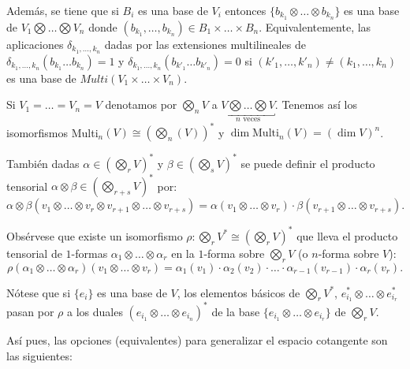 \documentclass[\main/VD_completo.tex]{subfiles}
\begin{document}
\begin{remark}
  Además, se tiene que si \(B_{i}\) es una base de \(V_{i}\) entonces
  \(\{b_{k_{1}}\otimes\dots\otimes b_{k_{n}}\}\) es una base de
  \(V_{1}\bigotimes\dots\bigotimes V_{n}\) donde
  \((b_{k_{1}},\dots,b_{k_{n}})\in B_{1}\times\dots\times B_{n}\).
  Equivalentemente, las aplicaciones \(\delta_{k_{1},\dots,k_{n}}\) dadas por las
  extensiones multilineales de \(\delta_{k_{1},\dots,k_{n}}(b_{k_{1}}\dots
  b_{k_{n}})=1\) y \(\delta_{k_{1},\dots,k_{n}}(b_{k'_{1}}\dots b_{k'_{n}})=0\)
  si \((k'_{1},\dots,k'_{n})\neq(k_{1},\dots,k_{n})\) es una base de 
  \(Multi(V_{1}\times\dots\times V_{n})\).

  Si \(V_{1}=\dots=V_{n}=V\) denotamos por \(\bigotimes_{n}V\) a
    \(\underbracket{V\bigotimes\dots\bigotimes V}_{n\text{ veces}}\). 
    Tenemos así los isomorfismos  Multi\(_{n}(V)\cong(\bigotimes_{n}(V))^{*}\) y
  \(\dim{\text{Multi}_{n}(V)}=(\dim{V})^{n}\).

  También dadas \(\alpha\in(\bigotimes_{r}V)^{*}\) y
  \(\beta\in(\bigotimes_{s}V)^{*}\) se puede definir el producto tensorial
  \(\alpha\otimes\beta\in(\bigotimes_{r+s}V)^{*}\) por:
  \[
    \alpha\otimes\beta(v_{1}\otimes\dots\otimes v_{r}\otimes
    v_{r+1}\otimes\dots\otimes v_{r+s})=\alpha(v_{1}\otimes\dots\otimes
    v_{r})\cdot \beta(v_{r+1}\otimes\dots\otimes v_{r+s}).
  \]

  Obsérvese que existe un isomorfismo
  \(\rho\colon\bigotimes_{r}V^*\cong(\bigotimes_{r}V)^{*}\) que lleva el producto
  tensorial de \(1\)-formas \(\alpha_{1}\otimes\dots\otimes\alpha_{r}\) en la
  \(1\)-forma sobre \(\bigotimes_{r}V\) (o \(n\)-forma sobre \(V\)):
  \[
    \rho(\alpha_{1}\otimes\dots\otimes\alpha_{r})(v_{1}\otimes\dots\otimes
    v_{r})=\alpha_{1}(v_{1})\cdot \alpha_2(v_2) \cdot \dots \cdot \alpha_{r-1}(v_{r-1}) \cdot \alpha_{r}(v_{r}).
  \]

  Nótese que si \(\{e_{i}\}\) es una base de \(V\), los elementos básicos de
  \(\bigotimes_{r}V^{*}\), \(e_{i_{1}}^{*}\otimes\dots\otimes e_{i_{r}}^{*}\)
  pasan por \(\rho\) a los duales \((e_{i_{1}}\otimes\dots\otimes
  e_{i_{n}})^{*}\) de la base \(\{e_{i_{1}}\otimes\dots\otimes e_{i_{r}}\}\) de
  \(\bigotimes_{r}V\).
\end{remark}

Así pues, las opciones (equivalentes) para generalizar el espacio cotangente son
las siguientes:
\end{document}
